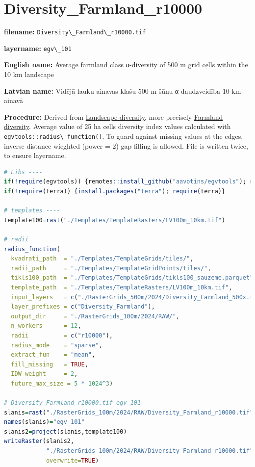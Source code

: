 \documentclass[
]{book}
\newcommand{\passthrough}[1]{#1}
\begin{document}
\section{Diversity\_Farmland\_r10000}\label{ch06.101}

\textbf{filename:} \passthrough{\lstinline!Diversity\_Farmland\_r10000.tif!}

\textbf{layername:} \passthrough{\lstinline!egv\_101!}

\textbf{English name:} Average farmland class α-diversity of 500 m grid cells within the 10 km landscape

\textbf{Latvian name:} Vidējā lauku ainavas klašu 500 m šūnu α-daudzveidība 10 km ainavā

\textbf{Procedure:} Derived from \hyperref[Ch05.04]{Landscape diversity}, more precisely
\hyperref[Ch05.04.0]{Farmland diversity}. Average value of 25 ha
cells diversity index values calculated with \passthrough{\lstinline!egvtools::radius\_function()!}. To
guard against missing values at the edges, inverse distance wieghted (power = 2)
gap filling is allowed. File is written twice, to ensure layername.

\begin{lstlisting}[language=R]
# Libs ----
if(!require(egvtools)) {remotes::install_github("aavotins/egvtools"); require(egvtools)}
if(!require(terra)) {install.packages("terra"); require(terra)}

# templates ----
template100=rast("./Templates/TemplateRasters/LV100m_10km.tif")

# radii
radius_function(
  kvadrati_path  = "./Templates/TemplateGrids/tiles/",
  radii_path     = "./Templates/TemplateGridPoints/tiles/",
  tikls100_path  = "./Templates/TemplateGrids/tikls100_sauzeme.parquet",
  template_path  = "./Templates/TemplateRasters/LV100m_10km.tif",
  input_layers   = c("./RasterGrids_500m/2024/Diversity_Farmland_500x.tif"),
  layer_prefixes = c("Diversity_Farmland"),
  output_dir     = "./RasterGrids_100m/2024/RAW/",
  n_workers      = 12,
  radii          = c("r10000"),
  radius_mode    = "sparse",
  extract_fun    = "mean",
  fill_missing   = TRUE,
  IDW_weight     = 2,
  future_max_size = 5 * 1024^3)

# Diversity_Farmland_r10000.tif egv_101
slanis=rast("./RasterGrids_100m/2024/RAW/Diversity_Farmland_r10000.tif")
names(slanis)="egv_101"
slanis2=project(slanis,template100)
writeRaster(slanis2,
            "./RasterGrids_100m/2024/RAW/Diversity_Farmland_r10000.tif",
            overwrite=TRUE)
\end{lstlisting}
\end{document}

